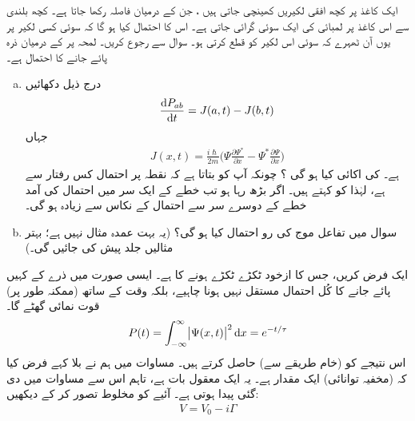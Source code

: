  ایک کاغذ پر کچھ افقی لکیریں کھینچی جاتی ہیں ، جن کے درمیان فاصلہ   رکھا جاتا ہے۔ کچھ بلندی سے اس کاغذ پر  لمبائی کی ایک سوئی گرائی جاتی ہے۔ اس کا  احتمال  کیا ہو گا کہ  سوئی کسی لکیر پر  یوں آن ٹھہرے کہ  سوئی اس لکیر کو قطع کرتی  ہو۔   سوال   سے رجوع کریں۔ 
 لمحہ  پر  کے درمیان  ذرہ پائے جانے کا احتمال  ہے۔ 
\begin{enumerate}[a.]
\item
 درج ذیل دکھائیں
\begin{align*}
\frac{ \dif P_{ab} }{ \dif t } = J ( a , t ) - J ( b , t )
\end{align*}
جہاں 
\begin{align*}
J( x , t ) = \frac{ i\hslash}{ 2 m } \big( \Psi \frac{ \partial \Psi^* }{ \partial x } - \Psi^* \frac{ \partial \Psi }{ \partial x } \big)
\end{align*}
ہے۔  کی اکائی کیا ہو گی ؟  چونکہ  آپ کو بتاتا ہے کہ نقطہ  پر احتمال کس رفتار سے  ہے، لہٰذا  کو  کہتے ہیں۔ اگر  بڑھ رہا ہو تب خطے کے ایک سر میں احتمال کی آمد خطے کے دوسرے سر سے احتمال کے نکاس سے زیادہ ہو گی۔ 
\item
 سوال  میں تفاعل موج کی رو  احتمال    کیا ہو گی؟ (یہ بہت عمدہ مثال نہیں ہے؛ بہتر مثالیں جلد پیش کی جائیں  گی۔)
\end{enumerate}
 ایک  فرض کریں، جس کا ازخود ٹکڑے ٹکڑے ہونے کا   ہے۔ ایسی صورت میں ذرے کے کہیں پائے جانے کا کُل احتمال مستقل نہیں ہونا چاہیے، بلکہ وقت کے ساتھ (ممکنہ طور پر)   قوت نمائی گھٹے گا۔
\begin{align*}
P(t) = \int_{-\infty }^{ \infty } \abs{\Psi ( x , t )}^2 \dif x=e^{-t/\tau}
\end{align*} 
 اس نتیجے کو (خام طریقے سے)  حاصل کرتے ہیں۔ مساوات  میں ہم نے بلا  کہے  فرض کیا کہ (مخفیہ توانائی)  ایک  مقدار ہے۔ یہ ایک معقول بات ہے، تاہم اس سے مساوات   میں دی گئی  پیدا ہوتی ہے۔ آئیے   کو مخلوط تصور کر کے دیکھیں:
\begin{align*}
V = V_0 - i \Gamma
\end{align*}
